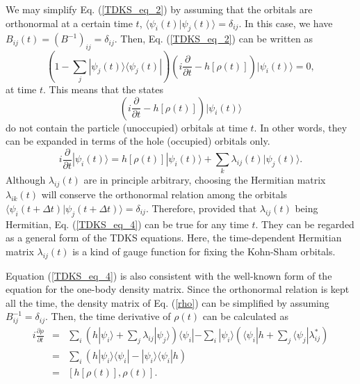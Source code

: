 \documentclass[twoside]{article}
\newcommand{\bra}[1]{\langle {#1} |}
\newcommand{\ket}[1]{| {#1} \rangle}
\newcommand{\inproduct}[2]{\langle #1 | #2 \rangle}
\begin{document}
{We may simplify Eq. (\ref{TDKS_eq_2}) by assuming that
the orbitals are orthonormal at a certain time $t$,
$\inproduct{\psi_i(t)}{\psi_j(t)}=\delta_{ij}$.
In this case, we have $B_{ij}(t)=(B^{-1})_{ij}=\delta_{ij}$.
Then, Eq. (\ref{TDKS_eq_2}) can be written as
\begin{equation}
\label{TDKS_eq_3}
\left(
1-\sum_j \ket{\psi_j(t)}\bra{\psi_j(t)}
\right)
\left( i\frac{\partial}{\partial t} - h[\rho(t)] \right)
\ket{\psi_i(t)} = 0 ,
\end{equation}
at time $t$.
This means that the states
\begin{equation}
\left( i\frac{\partial}{\partial t} - h[\rho(t)] \right) \ket{\psi_i(t)}
\end{equation}
do not contain the particle (unoccupied) orbitals at time $t$.
In other words,
they can be expanded in terms of the hole (occupied) orbitals only.
\begin{equation}
\label{TDKS_eq_4}
i\frac{\partial}{\partial t} \ket{\psi_i(t)} 
= h[\rho(t)] \ket{\psi_i(t)}
+ \sum_k \lambda_{ij}(t) \ket{\psi_j(t)} .
\end{equation}
Although $\lambda_{ij}(t)$ are in principle arbitrary,
choosing the Hermitian matrix $\lambda_{ik}(t)$
will conserve the orthonormal relation among
the orbitals $\inproduct{\psi_i(t+\Delta t)}{\psi_j(t+\Delta t)}=\delta_{ij}$.
Therefore, provided that $\lambda_{ij}(t)$ being Hermitian,
Eq. (\ref{TDKS_eq_4}) can be true for any time $t$.
They can be regarded as a general form of
the TDKS equations.
Here, the time-dependent Hermitian matrix $\lambda_{ij}(t)$ is
a kind of gauge function for fixing the Kohn-Sham orbitals.

Equation (\ref{TDKS_eq_4}) is also consistent with
the well-known form of the equation for the one-body density matrix.
Since the orthonormal relation is kept all the time,
the density matrix of Eq. (\ref{rho}) can be simplified by
assuming $B^{-1}_{ij}=\delta_{ij}$.
Then, the time derivative of $\rho(t)$ can be calculated as
\begin{eqnarray}
i\frac{\partial \rho}{\partial t} &=& \sum_i
\left( h \ket{\psi_i} + \sum_j \lambda_{ij} \ket{\psi_j} \right) \bra{\psi_i}
-\sum_i
\ket{\psi_i}\left( \bra{\psi_i} h + \sum_j \bra{\psi_j} \lambda_{ij}^* \right)
\\
&=& \sum_i \left( h\ket{\psi_i}\bra{\psi_i}
- \ket{\psi_i}\bra{\psi_i} h \right) \\
&=& \left[ h[\rho(t)],\rho(t) \right] .
\end{eqnarray}


}
\end{document}
